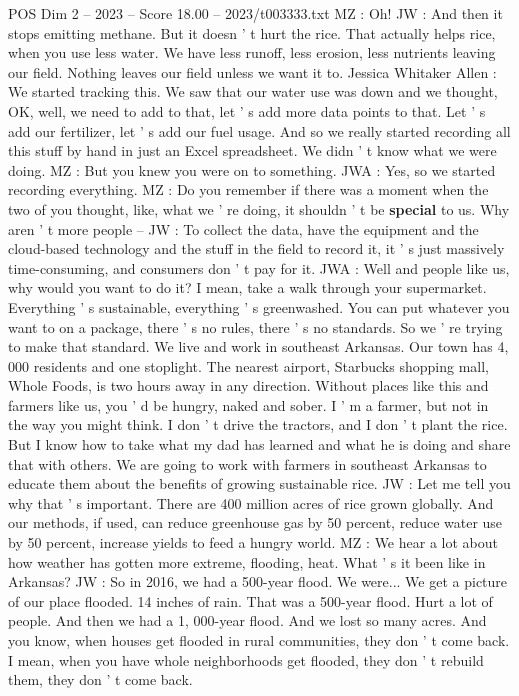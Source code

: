 \begin{textsample}{POS Dim 2 – 2023 – Score 18.00 – 2023/t003333.txt}
MZ : Oh!
JW : And then it stops emitting methane.
But it doesn ' t hurt the rice.
That actually helps rice, when you use less water.
We have less runoff, less erosion, less nutrients leaving our field.
Nothing leaves our field unless we want it to.
Jessica Whitaker Allen : We started tracking this.
We saw that our water use was down and we thought, OK, well, we need to add to that, let ' s add more data points to that.
Let ' s add our fertilizer, let ' s add our fuel usage.
And so we really started recording all this stuff by hand in just an Excel spreadsheet.
We didn ' t know what we were doing.
MZ : But you knew you were on to something.
JWA : Yes, so we started recording everything.
MZ : Do you remember if there was a moment when the two of you thought, like, what we ' re doing, it shouldn ' t be \textbf{special} to us.
Why aren ' t more people -- JW : To collect the data, have the equipment and the cloud-based technology and the stuff in the field to record it, it ' s just massively time-consuming, and consumers don ' t pay for it.
JWA : Well and people like us, why would you want to do it?
I mean, take a walk through your supermarket.
Everything ' s sustainable, everything ' s greenwashed.
You can put whatever you want to on a package, there ' s no rules, there ' s no standards.
So we ' re trying to make that standard.
We live and work in southeast Arkansas.
Our town has 4, 000 residents and one stoplight.
The nearest airport, Starbucks shopping mall, Whole Foods, is two hours away in any direction.
Without places like this and farmers like us, you ' d be hungry, naked and sober.
I ' m a farmer, but not in the way you might think.
I don ' t drive the tractors, and I don ' t plant the rice.
But I know how to take what my dad has learned and what he is doing and share that with others.
We are going to work with farmers in southeast Arkansas to educate them about the benefits of growing sustainable rice.
JW : Let me tell you why that ' s important.
There are 400 million acres of rice grown globally.
And our methods, if used, can reduce greenhouse gas by 50 percent, reduce water use by 50 percent, increase yields to feed a hungry world.
MZ : We hear a lot about how weather has gotten more extreme, flooding, heat.
What ' s it been like in Arkansas?
JW : So in 2016, we had a 500-year flood.
We were...
We get a picture of our place flooded. 14 inches of rain.
That was a 500-year flood.
Hurt a lot of people.
And then we had a 1, 000-year flood.
And we lost so many acres.
And you know, when houses get flooded in rural communities, they don ' t come back.
I mean, when you have whole neighborhoods get flooded, they don ' t rebuild them, they don ' t come back.

\end{textsample}
